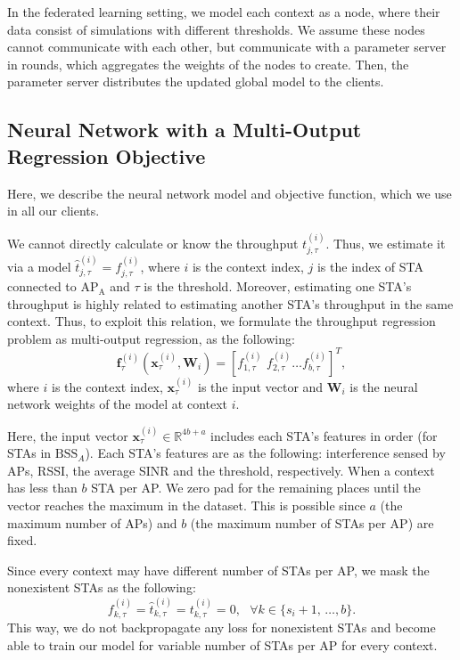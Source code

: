 \documentclass[journal]{IEEEtran}
\renewcommand{\vec}[1]{\boldsymbol{#1}}
\begin{document}
In the federated learning setting, we model each context as a node, where their data consist of simulations with different thresholds. We assume these nodes cannot communicate with each other, but communicate with a parameter server in rounds, which aggregates the weights of the nodes to create. Then, the parameter server distributes the updated global model to the clients.

\subsection{Neural Network with a Multi-Output Regression Objective}
Here, we describe the neural network model and objective function, which we use in all our clients.

We cannot directly calculate or know the throughput $t_{j, \tau}^{(i)}$. Thus, we estimate it via a model $\hat{t}^{(i)}_{j, \tau} = f^{(i)}_{j,\tau}$, where $i$ is the context index, $j$ is the index of STA connected to $\mathrm{AP}_\mathrm{A}$ and $\tau$ is the threshold. Moreover, estimating one STA's throughput is highly related to estimating another STA's throughput in the same context.  Thus, to exploit this relation, we formulate the throughput regression problem as multi-output regression, as the following:
\begin{equation}
    \vec{f}^{(i)}_\tau (\vec{x}_\tau^{(i)}, \vec{W}_i ) = \left[ f^{(i)}_{1,\tau} \, \, f^{(i)}_{2,\tau} \ldots f^{(i)}_{b,\tau} \right]^T,
\end{equation}
where $i$ is the context index, $\vec{x}_\tau^{(i)}$ is the input vector and $\vec{W}_i$ is the neural network weights of the model at context $i$.

Here, the input vector $\vec{x}_\tau^{(i)} \in \mathbb{R}^{4b+a}$ includes each STA's features in order (for STAs in $\mathrm{BSS}_A$). Each STA's features are as the following: interference sensed by APs, RSSI, the average SINR and the threshold, respectively. When a context has less than $b$ STA per AP. We zero pad for the remaining places until the vector reaches the maximum in the dataset. This is possible since $a$  (the maximum number of APs) and $b$ (the maximum number of STAs per AP) are fixed.

Since every context may have different number of STAs per AP, we mask the nonexistent STAs as the following:
\begin{equation*}
    f^{(i)}_{k, \tau} = \hat{t}^{(i)}_{k, \tau} = t^{(i)}_{k, \tau} = 0 , \, \, \, \, \forall k \in \{s_i + 1, \, \ldots , b \} .
\end{equation*}
This way, we do not backpropagate any loss for nonexistent STAs and become able to train our model for variable number of STAs per AP for every context. 
\end{document}
